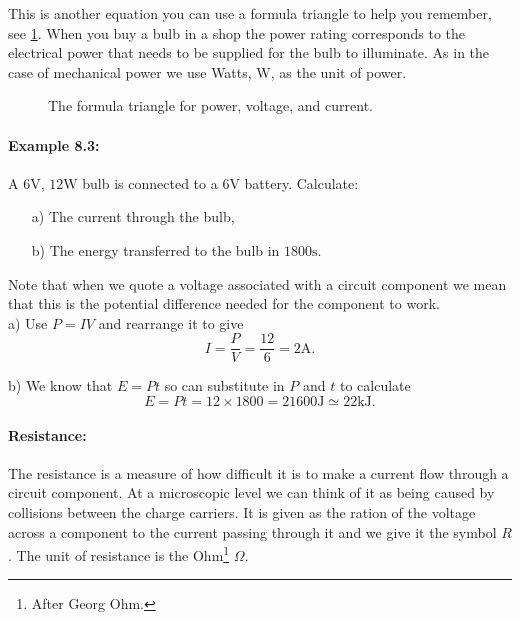 \documentclass[a4paper,12pt]{book}
\begin{document}
This is another equation you can use a formula triangle to help you remember, see \cref{fig: PIV triangle}.   When you buy a bulb in a shop the power rating corresponds to the electrical power that needs to be supplied for the bulb to illuminate. As in the case of mechanical power we use Watts, $\text{W}$, as the unit of power.

\begin{figure}[ht]
    \centering
  \large {}
    \caption{The formula triangle for power, voltage, and current. }
    \label{fig: PIV triangle}
\end{figure}


\paragraph{Example 8.3:} A $6\text{V}$, $12\text{W}$ bulb is connected to a $6\text{V}$ battery. Calculate:
\begin{itemize}
\setlength{\itemsep}{-5pt}
    \item[a)] The current through the bulb,
    \item[b)] The energy transferred to the bulb in $1800\text{s}$.
\end{itemize}  
Note that when we quote a voltage associated with a circuit component we mean that this is the potential difference needed for the component to work.\\

a) Use $P=IV$ and rearrange it to give
\begin{equation*}
I=\frac{P}{V}=\frac{12}{6}=2\text{A}.
\end{equation*}

b) We know that $E=Pt$ so can substitute in $P$ and $t$ to calculate
\begin{equation*}
E=Pt=12\times 1800=21600\text{J}\simeq 22\text{kJ}.
\end{equation*}


\paragraph{Resistance:} The resistance is a measure of how difficult it is to make a current flow through a circuit component. At a microscopic level we can think of it as being caused by collisions between the charge carriers. It is given as the ration of the voltage across a component to the current passing through it and we give it the symbol $R$. The unit of resistance is the Ohm\footnote{After Georg Ohm.} $\Omega$.\\
\end{document}
